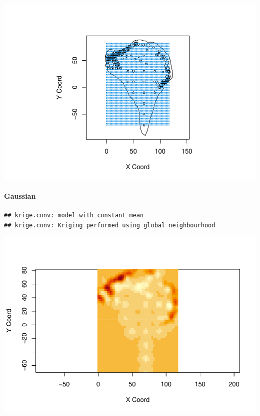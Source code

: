 \documentclass[
]{article}
\begin{document}
\includegraphics{Assignment_1_files/figure-latex/unnamed-chunk-44-1.pdf}

\hypertarget{gaussian-2}{%
\paragraph{Gaussian}\label{gaussian-2}}

\begin{verbatim}
## krige.conv: model with constant mean
## krige.conv: Kriging performed using global neighbourhood
\end{verbatim}

\includegraphics{Assignment_1_files/figure-latex/unnamed-chunk-45-1.pdf}
\end{document}

